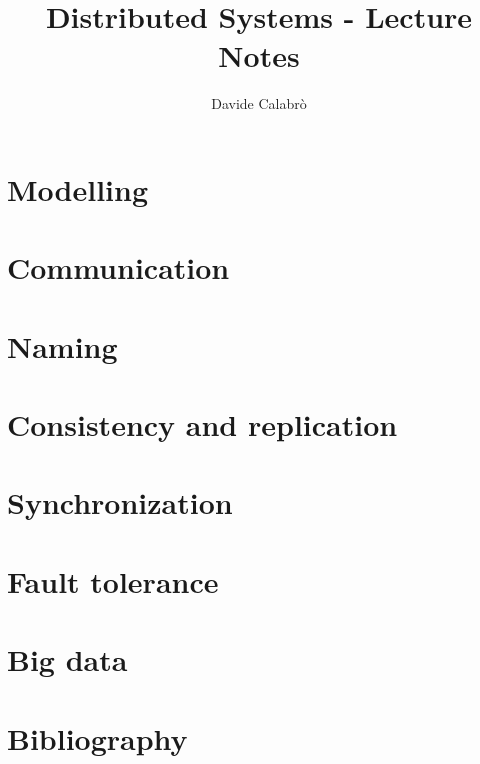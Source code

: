 \documentclass{article}
\title{Distributed Systems - Lecture Notes}
\author{Davide Calabrò}
\begin{document}
    \maketitle
    \newpage
    
    \tableofcontents
    
    \newpage

    \section{Modelling}
    
    
    \newpage
    
    \section{Communication}
    
    
    \newpage
    
    \section{Naming}
    
    
    \newpage
    
    \section{Consistency and replication}
    
    
    \newpage
    
    \section{Synchronization}
    
    
    \newpage
    
    \section{Fault tolerance}
    
    
    \newpage
    
    \section{Big data}
    
    
    \newpage
    
    \section{Bibliography}
    
    
    
\end{document}
